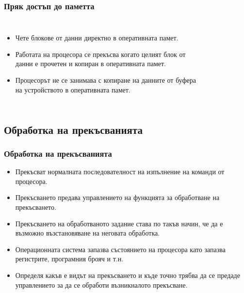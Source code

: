 \documentclass[ignorenonframetext, hyperref=unicode]{beamer}
\begin{document}
\begin{frame}
\frametitle{Пряк достъп до паметта}
\begin{columns}
\begin{itemize}
\item Чете блокове от данни директно в оперативната памет.
\item Работата на процесора се прекъсва когато целият блок от данни е прочетен и
копиран в оперативната памет.
\item Процесорът не се занимава с копиране на данните от буфера на устройството
в оперативната памет.
\end{itemize}
\begin{figure}[h]
\center
{}
\end{figure}
\end{columns}
\end{frame}


\subsection{Обработка на прекъсванията}

\begin{frame}
\frametitle{Обработка на прекъсванията}
\begin{itemize}
\item Прекъсват нормалната последователност на изпълнение на команди от
процесора.
\item Прекъсването предава управлението на функцията за обработване на
прекъсването.
\item Прекъсването на обработваното задание става по такъв начин, че да е
възможно възстановяване на неговата обработка.
\item Операционната система запазва състоянието на процесора като запазва
регистрите, програмния брояч и т.н.
\item Определя какъв е видът на прекъсването и къде точно трябва да се
предаде управлението за да се обработи възникналото прекъсване.
\end{itemize}
\end{frame}
\end{document}
